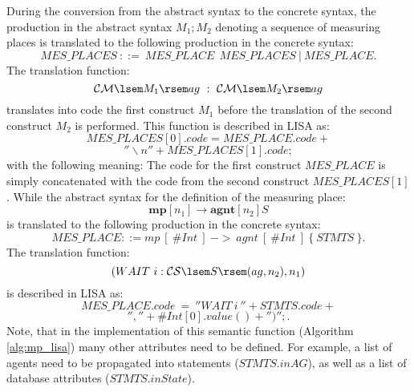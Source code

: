 \documentclass[preprint, prX]{revtex4}
\begin{document}
During the conversion from the abstract syntax to the concrete syntax, the production in the abstract syntax $M_1;M_2$
denoting a sequence of measuring places is translated to the following production
in the concrete syntax:
\footnotesize
\begin{equation*}
\mathit{MES\_PLACES}\ ::=\ \mathit{MES\_PLACE}\ \mathit{~MES\_PLACES\ |\ MES\_PLACE}.
\end{equation*}
\normalsize
The translation function:
\footnotesize
\begin{equation*}
\mathcal{CM} \lsem M_{1} \rsem ag\ :\ \mathcal{CM} \lsem M_{2} \rsem ag
\end{equation*}
\normalsize
translates into code the first construct $M_1$ before the translation of the second construct $M_2$ is performed. This function is
described in LISA as:
\footnotesize
\begin{equation*}
\mathit{MES\_PLACES}[0].code = \mathit{MES\_PLACE.code} +
\end{equation*}
\begin{equation*}
''\backslash n'' + \mathit{MES\_PLACES[1].code};
\end{equation*}
\normalsize
with the following meaning: The code for the first construct $\mathit{MES\_PLACE}$ is simply concatenated with the code from the second construct $MES\_PLACES[1]$. While the abstract syntax for the definition of the measuring place:
\footnotesize
\begin{equation*}
\textbf{mp}[n_{1}] \rightarrow \textbf{agnt}[n_{2}] S
\end{equation*}
\normalsize
is translated to the following production in the concrete syntax:
\footnotesize
\begin{equation*}
\mathit{MES\_PLACE} ::= mp ~[ ~\#Int~ ] ~->~  agnt ~[ ~\#Int~ ] ~\{ ~STMTS ~\}.
\end{equation*}
\normalsize
The translation function:
\footnotesize
\begin{equation*}
(WAIT\ i:\mathcal{CS} \lsem S \rsem (ag, n_{2}), n_{1} )
\end{equation*}
\normalsize
is described in LISA as:
\footnotesize
\begin{equation*}
\mathit{MES\_PLACE.code}\ =\ ''WAIT\ i\ '' + STMTS.code +
\end{equation*}
\begin{equation*}
'','' + \#Int[0].value() + '')''; .
\end{equation*}
\normalsize
Note, that in the implementation of this semantic function (Algorithm \ref{alg:mp_lisa}) many other attributes need to be defined. For
example, a list of agents need to be propagated into statements ($STMTS.inAG$), as well as a list of database attributes ($STMTS.inState$).
\end{document}
